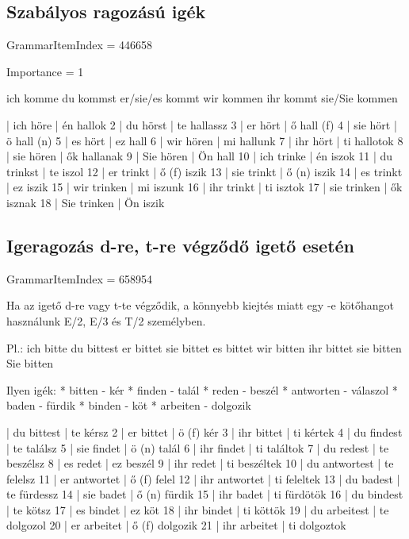 \documentclass{article}
\newenvironment{desc}{\verbatim}{\endverbatim}
\newenvironment{exmp}{\verbatim}{\endverbatim}
\begin{document}
\subsection{Szabályos ragozású igék}

GrammarItemIndex = 446658

Importance = 1

\begin{desc}
ich komme
du kommst
er/sie/es kommt
wir kommen
ihr kommt
sie/Sie kommen
\end{desc}

\begin{exmp}
1 | ich höre | én hallok
2 | du hörst | te hallassz
3 | er hört | ő hall (f)
4 | sie hört | ö hall (n)
5 | es hört | ez hall
6 | wir hören | mi hallunk
7 | ihr hört | ti hallotok
8 | sie hören | ők hallanak
9 | Sie hören | Ön hall
10 | ich trinke | én iszok
11 | du trinkst | te iszol
12 | er trinkt | ő (f) iszik
13 | sie trinkt | ő (n) iszik
14 | es trinkt | ez iszik
15 | wir trinken | mi iszunk
16 | ihr trinkt | ti isztok
17 | sie trinken | ők isznak
18 | Sie trinken | Ön iszik
\end{exmp}

\subsection{Igeragozás d-re, t-re végződő igető esetén}

GrammarItemIndex = 658954

\begin{desc}
Ha az igető d-re vagy t-te végződik, a könnyebb kiejtés miatt egy -e
kötőhangot használunk E/2, E/3 és T/2 személyben.

Pl.:
ich bitte
du bittest
er bittet
sie bittet
es bittet
wir bitten
ihr bittet
sie bitten
Sie bitten

Ilyen igék:
* bitten - kér
* finden - talál
* reden - beszél
* antworten - válaszol
* baden - fürdik
* binden - köt
* arbeiten - dolgozik
\end{desc}

\begin{exmp}
1 | du bittest | te kérsz
2 | er bittet | ö (f) kér
3 | ihr bittet | ti kértek
4 | du findest | te találsz
5 | sie findet | ö (n) talál
6 | ihr findet | ti találtok
7 | du redest | te beszélsz
8 | es redet | ez beszél
9 | ihr redet | ti beszéltek
10 | du antwortest | te felelsz
11 | er antwortet | ő (f) felel
12 | ihr antwortet | ti feleltek
13 | du badest | te fürdessz
14 | sie badet | ő (n) fürdik
15 | ihr badet | ti fürdötök
16 | du bindest | te kötsz
17 | es bindet | ez köt
18 | ihr bindet | ti köttök
19 | du arbeitest | te dolgozol
20 | er arbeitet | ő (f) dolgozik
21 | ihr arbeitet | ti dolgoztok
\end{exmp}
\end{document}

